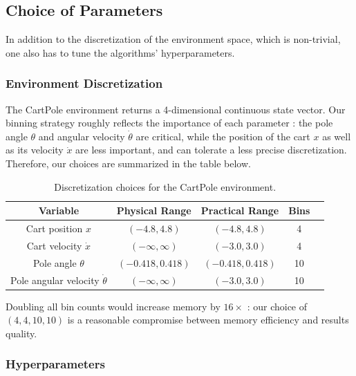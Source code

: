\documentclass[10pt,conference,compsocconf]{IEEEtran}
\begin{document}
        \appendix

        \subsection{Choice of Parameters}
        
        In addition to the discretization of the environment space, which is non-trivial, one also has to tune the algorithms' hyperparameters.
        
        \subsubsection{Environment Discretization}
        
        The CartPole environment returns a 4-dimensional continuous state vector. Our binning strategy roughly reflects the importance of each parameter : the pole angle $\theta$ and angular velocity $\dot{\theta}$ are critical, while the position of the cart $x$ as well as its velocity $\dot{x}$ are less important, and can tolerate a less precise discretization. Therefore, our choices are summarized in the table below.

        \begin{table}[h]
        \centering
        \begin{tabular}{|c|c|c|c|c|}
        \hline
        \textbf{Variable} & \textbf{Physical Range} & \textbf{ Practical Range } & \textbf{Bins}\\ \hline
        Cart position $x$ & $(-4.8, 4.8)$ & $(-4.8, 4.8)$ & 4 \\
        Cart velocity $\dot{x}$ & $(-\infty, \infty)$ & $(-3.0, 3.0)$ & 4 \\
        Pole angle $\theta$ & $(-0.418, 0.418)$ & $(-0.418, 0.418)$ & 10 \\
        Pole angular velocity $\dot{\theta}$ & $(-\infty, \infty)$ & $(-3.0, 3.0)$ & 10 \\ \hline
        \end{tabular}
        \caption{Discretization choices for the CartPole environment.}
        \label{tab:cartpole_obs}
        \end{table}
    
       Doubling all bin counts would increase memory by $16\times$ : our choice of $(4, 4, 10, 10)$ is a reasonable compromise between memory efficiency and results quality.
    
       \subsubsection{Hyperparameters}
    
\end{document}

